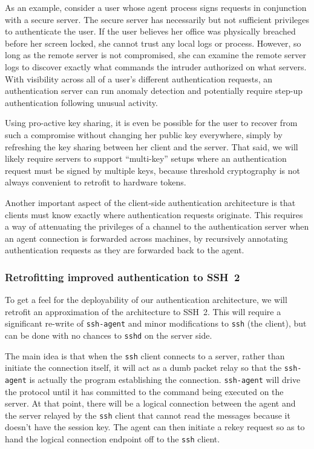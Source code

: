 \documentclass[11pt]{article}
\begin{document}
As an example, consider a user whose agent process signs requests in
conjunction with a secure server.  The secure server has necessarily
but not sufficient privileges to authenticate the user.  If the user
believes her office was physically breached before her screen locked,
she cannot trust any local logs or process.  However, so long as the
remote server is not compromised, she can examine the remote server
logs to discover exactly what commands the intruder authorized on what
servers.  With visibility across all of a user's different
authentication requests, an authentication server can run anomaly
detection and potentially require step-up authentication following
unusual activity.

Using pro-active key sharing, it is even be possible for the user to
recover from such a compromise without changing her public key
everywhere, simply by refreshing the key sharing between her client
and the server.  That said, we will likely require servers to support
``multi-key'' setups where an authentication request must be signed by
multiple keys, because threshold cryptography is not always convenient
to retrofit to hardware tokens.

Another important aspect of the client-side authentication
architecture is that clients must know exactly where authentication
requests originate.  This requires a way of attenuating the privileges
of a channel to the authentication server when an agent connection is
forwarded across machines, by recursively annotating authentication
requests as they are forwarded back to the agent.

\subsubsection{Retrofitting improved authentication to SSH~2}

To get a feel for the deployability of our authentication
architecture, we will retrofit an approximation of the architecture to
SSH~2.  This will require a significant re-write of \texttt{ssh-agent}
and minor modifications to \texttt{ssh} (the client), but can be done
with no chances to \texttt{sshd} on the server side.

The main idea is that when the \texttt{ssh} client connects to a
server, rather than initiate the connection itself, it will act as a
dumb packet relay so that the \texttt{ssh-agent} is actually the
program establishing the connection.  \texttt{ssh-agent} will drive
the protocol until it has committed to the command being executed on
the server.  At that point, there will be a logical connection between
the agent and the server relayed by the \texttt{ssh} client that
cannot read the messages because it doesn't have the session key.  The
agent can then initiate a rekey request so as to hand the logical
connection endpoint off to the \texttt{ssh} client.
\end{document}
